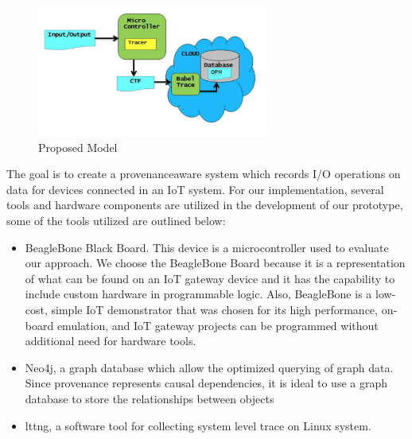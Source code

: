 \begin{figure}[h]
\begin{center}

\includegraphics[width =3.0in]{architecture.PNG}    
\end{center}
\caption{Proposed Model}
\label{autom}
\end{figure}

The goal is to create a provenance\-aware system which records I/O operations on data for devices connected in an IoT system. For our implementation, several tools and hardware components are utilized in the development of our prototype, some of the tools utilized are outlined below:

\begin{itemize}
\item BeagleBone Black Board. This device is a microcontroller used to evaluate our approach. We choose the BeagleBone Board because it is a representation of what can be found on an IoT gateway device and it has the capability to include custom hardware in programmable logic. Also, BeagleBone is a low­ cost, simple IoT demonstrator that was chosen for its high­ performance, on­board emulation, and IoT gateway projects can be programmed without additional need for hardware tools.


\item Neo4j, a graph database which allow the optimized querying of graph data. Since provenance represents causal dependencies, it is ideal to use a graph database to store the relationships between objects

\item lttng, a software tool for collecting system level trace on Linux system. 

\end{itemize}


